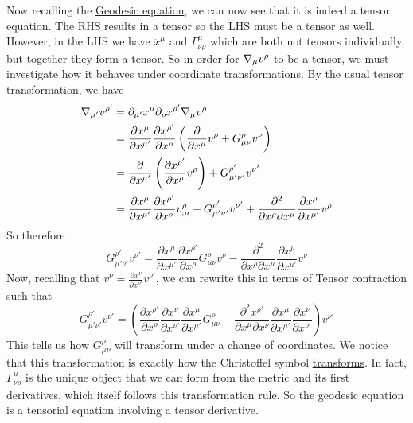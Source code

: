 \documentclass{article}
\begin{document}
 			Now recalling the \hyperref[eq:CleanGeodesic]{Geodesic equation}, we can now see that it is indeed a tensor equation. The RHS results in a tensor so the LHS must be a tensor as well. However, in the LHS we have $\ddot{x}^\mu$ and $\Gamma_{\nu\rho}^\mu$ which are both not tensors individually, but together they form a tensor.
 			So in order for $\nabla_\mu v^\rho$ to be a tensor, we must investigate how it behaves under coordinate transformations. By the usual tensor transformation, we have
 			\begin{align*}
 				\nabla_{\mu'} v^{\rho'} &= \partial_{\mu'} x^\mu \partial_{\rho} x^{\rho'} \nabla_\mu v^\rho\\ 
 				&= \frac{\partial x^\mu}{\partial x^{\mu'}} \frac{\partial x^{\rho'}}{\partial x^\rho} \left( \frac{\partial}{\partial x^\mu} v^\rho + G_{\mu\nu}^\rho v^\nu \right) \\
 				&= \frac{\partial}{\partial x^{\mu'}} \left( \frac{\partial x^{\rho'}}{\partial x^\rho} v^\rho\right) + G_{\mu'\nu'}^{\rho'} v^{\nu'}  \\
 				&= \frac{\partial x^\mu}{\partial x^{\mu'}} \frac{\partial x^{\rho'}}{\partial x^\rho} v^\rho_{;\mu} + G_{\mu'\nu'}^{\rho'} v^{\nu'} + \frac{\partial^2}{\partial x^\rho \partial x^\mu} \frac{\partial x^\mu}{\partial x^{\mu'}} v^\rho
 			\end{align*}
 			So therefore
 			$$
 				G_{\mu'\nu'}^{\rho'} v^{\nu'} =  \frac{\partial x^\mu}{\partial x^{\mu'}} \frac{\partial x^{\rho'}}{\partial x^\rho} G_{\mu\nu}^\rho v^\nu - \frac{\partial^2}{\partial x^\rho \partial x^\mu} \frac{\partial x^\mu}{\partial x^{\mu'}} v^\nu
 			$$
 			Now, recalling that $v^\nu = \frac{\partial x^\nu}{\partial x^{\nu'}} v^{\nu'}$, we can rewrite this in terms of Tensor contraction such that
 			\begin{equation}
 				\boxed{G_{\mu'\nu'}^{\rho'} v^{\nu'} = \left( \frac{\partial x^{\rho'}}{\partial x^\rho} \frac{\partial x^{\nu}}{\partial x^{\nu'}}\frac{\partial x^\mu}{\partial x^{\mu'}} G_{\mu\nu}^\rho - \frac{\partial^2 x^{\rho'}}{\partial x^\mu \partial x^\nu} \frac{\partial x^\mu}{\partial x^{\mu'}} \frac{\partial x^{\nu}}{\partial x^{\nu'}} \right) v^{\nu'}}
 			\end{equation}
 			This tells us how $G^\rho_{\mu\nu}$ will transform under a change of coordinates. We notice that this transformation is exactly how the Christoffel symbol \hyperref[eq:ChristoffelTransformation]{transforms}. In fact, $\Gamma_{\nu\rho}^\mu$ is the unique object that we can form from the metric and its first derivatives, which itself follows this transformation rule. So the geodesic equation is a tensorial equation involving a tensor derivative. 
\end{document}
